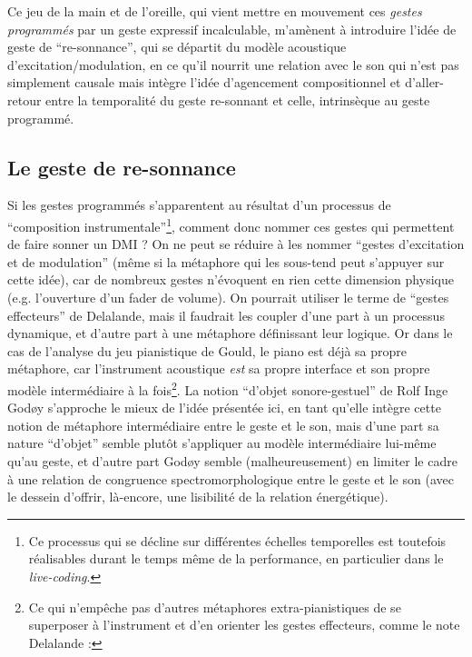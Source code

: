 \indent Ce jeu de la main et de l'oreille, qui vient mettre en mouvement ces \textit{gestes programmés} par un geste expressif incalculable, m'amènent à introduire l'idée de geste de ``re-sonnance'', qui se départit du modèle acoustique d'excitation/modulation, en ce qu'il nourrit une relation avec le son qui n'est pas simplement causale mais intègre l'idée d'agencement compositionnel et d'aller-retour entre la temporalité du geste re-sonnant et celle, intrinsèque au geste programmé.

\subsection{Le geste de re-sonnance}

\noindent Si les gestes programmés s'apparentent au résultat d'un processus de ``composition instrumentale''\footnote{Ce processus qui se décline sur différentes échelles temporelles est toutefois réalisables durant le temps même de la performance, en particulier dans le \textit{live-coding}.}, comment donc nommer ces gestes qui permettent de faire sonner un \gls{DMI} ? On ne peut se réduire à les nommer ``gestes d'excitation et de modulation'' (même si la métaphore qui les sous-tend peut s'appuyer sur cette idée), car de nombreux gestes n'évoquent en rien cette dimension physique (e.g. l'ouverture d'un fader de volume). On pourrait utiliser le terme de ``gestes effecteurs'' de Delalande, mais il faudrait les coupler d'une part à un processus dynamique, et d'autre part à une métaphore définissant leur logique. Or dans le cas de l'analyse du jeu pianistique de Gould, le piano est déjà sa propre métaphore, car l'instrument acoustique \textit{est} sa propre interface et son propre modèle intermédiaire à la fois\footnote{Ce qui n'empêche pas d'autres métaphores extra-pianistiques de se superposer à l'instrument et d'en orienter les gestes effecteurs, comme le note Delalande : }. La notion ``d'objet sonore-gestuel'' de Rolf Inge Godøy s'approche le mieux de l'idée présentée ici, en tant qu'elle intègre cette notion de métaphore intermédiaire entre le geste et le son, mais d'une part sa nature ``d'objet'' semble plutôt s'appliquer au modèle intermédiaire lui-même qu'au geste, et d'autre part Godøy semble (malheureusement) en limiter le cadre à une relation de congruence spectromorphologique entre le geste et le son (avec le dessein d'offrir, là-encore, une lisibilité de la relation énergétique).\\
